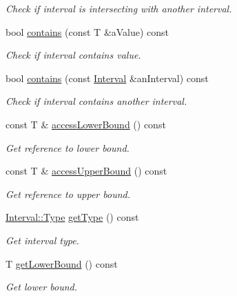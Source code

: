 \begin{DoxyCompactItemize}
\begin{DoxyCompactList}\small\item\em Check if interval is intersecting with another interval. \end{DoxyCompactList}\item 
bool \hyperlink{classlibrary_1_1math_1_1obj_1_1_interval_af100f4b53dc3211efde2733c19e458c3}{contains} (const T \&a\+Value) const
\begin{DoxyCompactList}\small\item\em Check if interval contains value. \end{DoxyCompactList}\item 
bool \hyperlink{classlibrary_1_1math_1_1obj_1_1_interval_a3bace75e3cfb5f5c737e642c08572d25}{contains} (const \hyperlink{classlibrary_1_1math_1_1obj_1_1_interval}{Interval} \&an\+Interval) const
\begin{DoxyCompactList}\small\item\em Check if interval contains another interval. \end{DoxyCompactList}\item 
const T \& \hyperlink{classlibrary_1_1math_1_1obj_1_1_interval_ada0dc68134cfacd5a0e959b492cea534}{access\+Lower\+Bound} () const
\begin{DoxyCompactList}\small\item\em Get reference to lower bound. \end{DoxyCompactList}\item 
const T \& \hyperlink{classlibrary_1_1math_1_1obj_1_1_interval_a99692ee706ae6de7cd274ceae3644138}{access\+Upper\+Bound} () const
\begin{DoxyCompactList}\small\item\em Get reference to upper bound. \end{DoxyCompactList}\item 
\hyperlink{classlibrary_1_1math_1_1obj_1_1_interval_base_aabce6fa07a6e2e8fd3fcab5fd0d317d6}{Interval\+::\+Type} \hyperlink{classlibrary_1_1math_1_1obj_1_1_interval_a881ab7e17883b4f1553d7e8ba9cc7656}{get\+Type} () const
\begin{DoxyCompactList}\small\item\em Get interval type. \end{DoxyCompactList}\item 
T \hyperlink{classlibrary_1_1math_1_1obj_1_1_interval_a4e01721016dd02dddc93fb012ff7d5b3}{get\+Lower\+Bound} () const
\begin{DoxyCompactList}\small\item\em Get lower bound. \end{DoxyCompactList}\item 

\end{DoxyCompactItemize}
